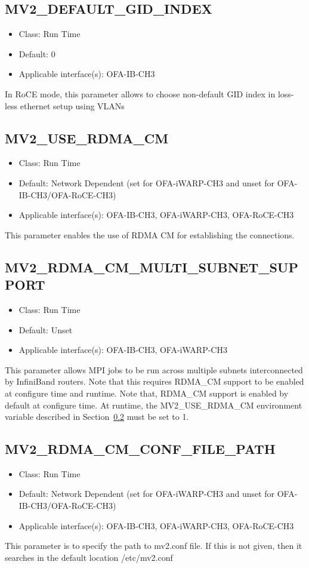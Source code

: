 \subsection{MV2\_DEFAULT\_GID\_INDEX}
\label{def:mv2-gid-index}
\begin{itemize}
    \item Class: Run Time
    \item Default: 0
    \item Applicable interface(s): OFA-IB-CH3
\end{itemize}
In RoCE mode, this parameter allows to choose non-default GID index in loss-less
ethernet setup using VLANs

\subsection{MV2\_USE\_RDMA\_CM}
\label{def:mv2-use-rdma-cm}
\begin{itemize}
    \item Class: Run Time
    \item Default: Network Dependent (set for OFA-iWARP-CH3 and unset for OFA-IB-CH3/OFA-RoCE-CH3)
    \item Applicable interface(s): OFA-IB-CH3, OFA-iWARP-CH3, OFA-RoCE-CH3
\end{itemize}
This parameter enables the use of RDMA CM for establishing the
connections. 

\subsection{MV2\_RDMA\_CM\_MULTI\_SUBNET\_SUPPORT}
\label{def:mv2-rdma-cm-multi-subnet-support}
\begin{itemize}
    \item Class: Run Time
    \item Default: Unset
    \item Applicable interface(s): OFA-IB-CH3, OFA-iWARP-CH3
\end{itemize}
This parameter allows MPI jobs to be run across multiple subnets interconnected
by InfiniBand routers. Note that this requires RDMA\_CM support to be enabled at
configure time and runtime. Note that, RDMA\_CM support is enabled by default at
configure time. At runtime, the MV2\_USE\_RDMA\_CM environment variable
described in Section~\ref{def:mv2-use-rdma-cm} must be set to 1.

\subsection{MV2\_RDMA\_CM\_CONF\_FILE\_PATH}
\label{def:mv2-rdma-cm-conf-file-path}
\begin{itemize}
    \item Class: Run Time
    \item Default: Network Dependent (set for OFA-iWARP-CH3 and unset for OFA-IB-CH3/OFA-RoCE-CH3)
    \item Applicable interface(s): OFA-IB-CH3, OFA-iWARP-CH3, OFA-RoCE-CH3
\end{itemize}
This parameter is to specify the path to mv2.conf file. If this is not given, then it searches
in the default location /etc/mv2.conf


